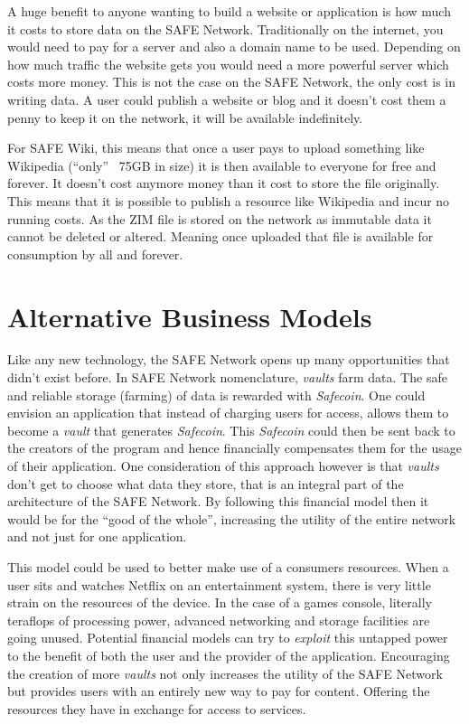 A huge benefit to anyone wanting to build a website or application is how much it costs to store data on the SAFE Network. Traditionally on the internet, you would need to pay for a server and also a domain name to be used. Depending on how much traffic the website gets you would need a more powerful server which costs more money. This is not the case on the SAFE Network, the only cost is in writing data. A user could publish a website or blog and it doesn't cost them a penny to keep it on the network, it will be available indefinitely.
 
For SAFE Wiki, this means that once a user pays to upload something like Wikipedia (``only'' ~75GB in size) it is then available to everyone for free and forever. It doesn't cost anymore money than it cost to store the file originally. This means that it is possible to publish a resource like Wikipedia and incur no running costs. As the ZIM file is stored on the network as immutable data it cannot be deleted or altered. Meaning once uploaded that file is available for consumption by all and forever.
 
\section{Alternative Business Models}

Like any new technology, the SAFE Network opens up many opportunities that didn't exist before. In SAFE Network nomenclature, \textit{vaults} farm data. The safe and reliable storage (farming) of data is rewarded with \textit{Safecoin}. One could envision an application that instead of charging users for access, allows them to become a \textit{vault} that generates \textit{Safecoin}. This \textit{Safecoin} could then be sent back to the creators of the program and hence financially compensates them for the usage of their application. One consideration of this approach however is that \textit{vaults} don't get to choose what data they store, that is an integral part of the architecture of the SAFE Network. By following this financial model then it would be for the ``good of the whole'', increasing the utility of the entire network and not just for one application.

This model could be used to better make use of a consumers resources. When a user sits and watches Netflix on an entertainment system, there is very little strain on the resources of the device. In the case of a games console, literally teraflops of processing power, advanced networking and storage facilities are going unused. Potential financial models can try to \textit{exploit} this untapped power to the benefit of both the user and the provider of the application. Encouraging the creation of more \textit{vaults} not only increases the utility of the SAFE Network but provides users with an entirely new way to pay for content. Offering the resources they have in exchange for access to services.

